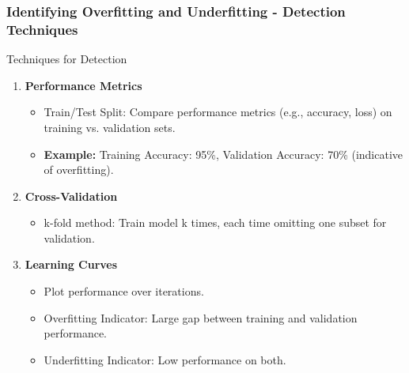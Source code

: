 \documentclass[aspectratio=169]{beamer}
\begin{document}
\begin{frame}[fragile]
    \frametitle{Identifying Overfitting and Underfitting - Detection Techniques}
    \begin{block}{Techniques for Detection}
        \begin{enumerate}
            \item \textbf{Performance Metrics}
            \begin{itemize}
                \item Train/Test Split: Compare performance metrics (e.g., accuracy, loss) on training vs. validation sets.
                \item \textbf{Example:} Training Accuracy: 95\%, Validation Accuracy: 70\% (indicative of overfitting).
            \end{itemize}
            
            \item \textbf{Cross-Validation}
            \begin{itemize}
                \item k-fold method: Train model k times, each time omitting one subset for validation.
            \end{itemize}
            
            \item \textbf{Learning Curves}
            \begin{itemize}
                \item Plot performance over iterations. 
                \item Overfitting Indicator: Large gap between training and validation performance.
                \item Underfitting Indicator: Low performance on both.
            \end{itemize}
        \end{enumerate}
    \end{block}
\end{frame}
\end{document}
